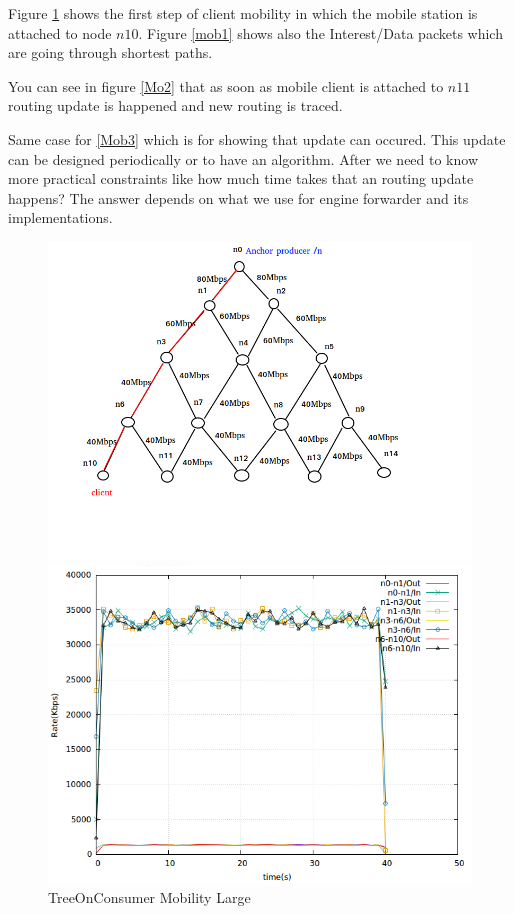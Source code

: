 Figure \ref{Mob1} shows the first step of client mobility in which the mobile station is attached to node $n10$. Figure \ref{mob1} shows also the Interest/Data packets which are going through shortest paths.

You can see in figure \ref{Mo2} that as soon as mobile client is attached to $n11$ routing update is happened and new routing is traced.

Same case for \ref{Mob3} which is for showing that update can occured. This update can be designed periodically or to have an algorithm. After we need to know more practical constraints like how much time takes that an routing update happens? The answer depends on what we use for engine forwarder and its implementations. 



\begin{figure}[H]

\begin{center}

\includegraphics[scale = 0.4]{Figures/Mob1.png}

\caption{TreeOnConsumer Mobility Large} \label{Mob1} 


\includegraphics[scale = 0.4]{Figures/mob1.png}


\end{center}
\end{figure}
